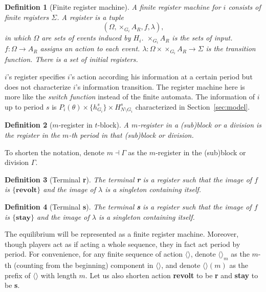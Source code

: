 \documentclass[12pt,letter]{article}
\newtheorem{definition}{Definition}[section]
\theoremstyle{definition}
\theoremstyle{remark}
\theoremstyle{claim}
\begin{document}
\begin{definition}[Finite register machine]
A finite register machine for $i$ consists of finite registers $\Sigma$. A register is a tuple \[(\Omega, \times_{G_i}A_R,f,\lambda),\] in which $\Omega$ are sets of events induced by $H_i$. $\times_{G_i}A_R$ is the sets of input. $f:\Omega\rightarrow A_{R}$ assigns an action to each event. $\lambda: \Omega\times \times_{G_i}A_R \rightarrow \Sigma$ is the transition function. There is a set of initial registers. 
\end{definition}

$i$'s register specifies $i$'s action according his information at a certain period but does not characterize $i$'s information transition. The register machine here is more like the \textit{switch function} instead of the finite automata. The information of $i$ up to period $s$ is $P_i(\theta)\times \{h^s_{G_i}\}\times H^s_{N\setminus G_i}$ characterized in Section~\ref{sec:model}. 

\begin{definition}[$m$-register in $t$-block]
A $m$-register in a (sub)block or a division is the register in the $m$-th period in that (sub)block or division.
\end{definition}

To shorten the notation, denote $m\dashv\Gamma$ as the $m$-register in the (sub)block or division $\Gamma$.

\begin{definition}[Terminal \textbf{r}]
The terminal \textbf{r} is a register such that the image of $f$ is $\{\textbf{revolt}\}$ and the image of $\lambda$ is a singleton containing itself. 
\end{definition}

\begin{definition}[Terminal \textbf{s}]
The terminal \textbf{s} is a register such that the image of $f$ is $\{\textbf{stay}\}$ and the image of $\lambda$ is a singleton containing itself. 
\end{definition}

The equilibrium will be represented as a {finite register machine}. Moreover, though players act as if acting a whole sequence, they in fact act period by period. For convenience, for any finite sequence of action $\langle \rangle$, denote $\langle \rangle_m$ as the $m$-th (counting from the beginning) component in $\langle \rangle$, and denote $\langle \rangle(m)$ as the prefix of $\langle \rangle$ with length $m$. Let us also shorten action \textbf{revolt} to be \textbf{r} and \textbf{stay} to be \textbf{s}. 
\end{document}
